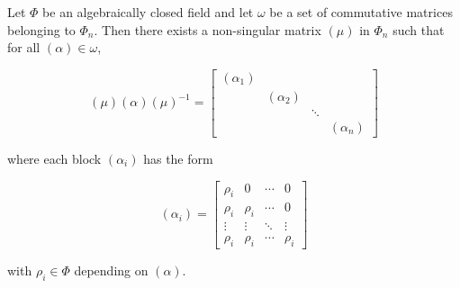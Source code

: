 Let $\Phi$ be an algebraically closed field and let $\omega$ be a set of commutative matrices belonging to $\Phi_n$. Then there exists a non-singular matrix $(\mu)$ in $\Phi_n$ such that for all $(\alpha) \in \omega$,

$$(\mu)(\alpha)(\mu)^{-1} = \begin{bmatrix}
(\alpha_1) & & \\
& (\alpha_2) & \\
& & \ddots \\
& & & (\alpha_n)
\end{bmatrix}$$

where each block $(\alpha_i)$ has the form

$$(\alpha_i) = \begin{bmatrix}
\rho_i & 0 & \cdots & 0 \\
\rho_i & \rho_i & \cdots & 0 \\
\vdots & \vdots & \ddots & \vdots \\
\rho_i & \rho_i & \cdots & \rho_i
\end{bmatrix}$$

with $\rho_i \in \Phi$ depending on $(\alpha)$.
